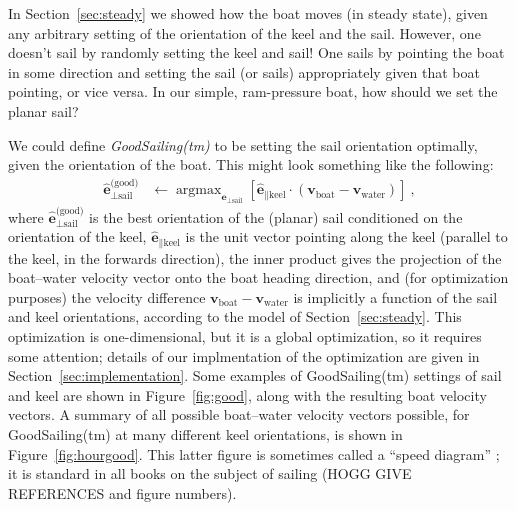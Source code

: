 \documentclass[letterpaper]{article}
\DeclareMathOperator*{\argmax}{argmax}
\renewcommand{\vec}[1]{\boldsymbol{#1}}
\newcommand{\uvec}{\vec{\hat{e}}}
\newcommand{\water}{\text{water}}
\newcommand{\boat}{\text{boat}}
\newcommand{\good}{\text{(good)}}
\newcommand{\sail}{\text{sail}}
\newcommand{\keel}{\text{keel}}
\newcommand{\vwater}{\vec{v}_\water}
\newcommand{\vboat}{\vec{v}_\boat}
\newcommand{\secref}[1]{Section~\ref{#1}}
\newcommand{\figref}[1]{Figure~\ref{#1}}
\begin{document}
In \secref{sec:steady} we showed how the boat moves (in steady state), given any arbitrary setting of the orientation of the keel and the sail.
However, one doesn't sail by randomly setting the keel and sail!
One sails by pointing the boat in some direction and setting the sail (or sails) appropriately given that boat pointing, or vice versa.
In our simple, ram-pressure boat, how should we set the planar sail?

We could define \emph{GoodSailing(tm)} to be setting the sail orientation optimally, given the orientation of the boat.
This might look something like the following:
\begin{align}\label{eq:good}
    \uvec_{\perp\sail}^\good &\leftarrow \argmax_{\uvec_{\perp\sail}} \left[\uvec_{\parallel\keel}\cdot(\vboat-\vwater)\right] ~,
\end{align}
where $\uvec_{\perp\sail}^\good$ is the best orientation of the (planar) sail conditioned on the orientation of the keel,
$\uvec_{\parallel\keel}$ is the unit vector pointing along the keel (parallel to the keel, in the forwards direction),
the inner product gives the projection of the boat--water velocity vector onto the boat heading direction,
and (for optimization purposes) the velocity difference $\vboat-\vwater$ is implicitly a function of the sail and keel orientations, according to the model of \secref{sec:steady}.
This optimization is one-dimensional, but it is a global optimization, so it requires some attention; details of our implmentation of the optimization are given in \secref{sec:implementation}.
Some examples of GoodSailing(tm) settings of sail and keel are shown in \figref{fig:good}, along with the resulting boat velocity vectors.
A summary of all possible boat--water velocity vectors possible, for GoodSailing(tm) at many different keel orientations, is shown in \figref{fig:hourgood}.
This latter figure is sometimes called a ``speed diagram'' \cite{pos}; it is standard in all books on the subject of sailing (HOGG GIVE REFERENCES and figure numbers).
\end{document}

